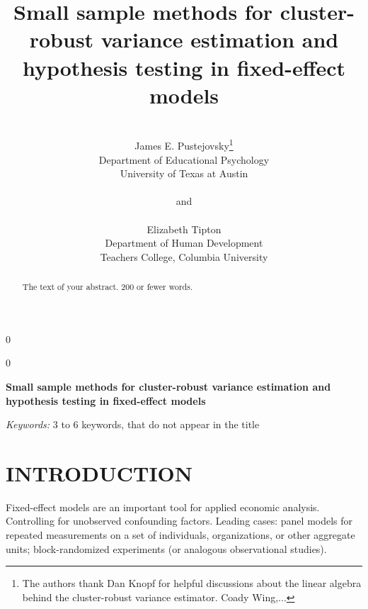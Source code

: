 \documentclass[12pt]{article}\usepackage[]{graphicx}\usepackage[]{color}
\newcommand{\blind}{0}
\begin{document}

\def\spacingset#1{\renewcommand{\baselinestretch}%
{#1}\small\normalsize} \spacingset{1}



\blind
{
  \title{\bf Small sample methods for cluster-robust variance estimation and hypothesis testing in fixed-effect models}
  \author{\\James E. Pustejovsky\thanks{
    The authors thank Dan Knopf for helpful discussions about the linear algebra behind the cluster-robust variance estimator. Coady Wing,...}\hspace{.2cm}\\
    Department of Educational Psychology \\ 
    University of Texas at Austin\\ \\
    and \\ \\
    Elizabeth Tipton \\
    Department of Human Development \\ 
    Teachers College, Columbia University}
  \maketitle
} \fi

\blind
{
  \bigskip
  \bigskip
  \bigskip
  \begin{center}
    {\LARGE\bf Small sample methods for cluster-robust variance estimation and hypothesis testing in fixed-effect models}
\end{center}
  \medskip
} \fi

\bigskip
\begin{abstract}
The text of your abstract.  200 or fewer words.
\end{abstract}

\noindent%
{\it Keywords:}  3 to 6 keywords, that do not appear in the title
\vfill

\newpage
\spacingset{1.45} %

\section{INTRODUCTION}
\label{sec:intro}



Fixed-effect models are an important tool for applied economic analysis. 
Controlling for unobserved confounding factors.
Leading cases: panel models for repeated measurements on a set of individuals, organizations, or other aggregate units; block-randomized experiments (or analogous observational studies). 
\end{document}
